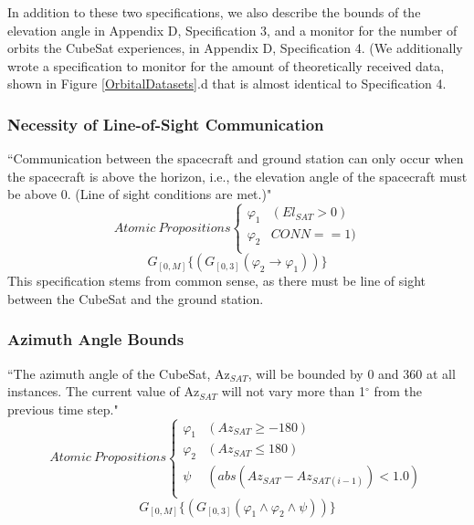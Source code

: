 \documentclass[conf]{new-aiaa}
\begin{document}
In addition to these two specifications, we also describe the bounds of the elevation angle in Appendix D, Specification 3, and a monitor for the number of orbits the CubeSat experiences, in Appendix D, Specification 4. (We additionally wrote a specification to monitor for the amount of theoretically received data, shown in Figure \ref{OrbitalDatasets}.d that is almost identical to Specification 4.

\subsubsection{\textbf{Necessity of Line-of-Sight Communication}}
“Communication between the spacecraft and ground station can only occur when the spacecraft is above the horizon, i.e., the elevation angle of the spacecraft must be above 0. (Line of sight conditions are met.)"
\[ Atomic\:Propositions \begin{cases}
  \varphi_1 & (El_{SAT} > 0) \\
  \varphi_2 & CONN == 1) \\
\end{cases} \]
\begin{equation}
    \label{Spec 1}
    G_{[0,M]} \{(G_{[0,3]}(\varphi_2 \rightarrow \varphi_1))\}
\end{equation} 
This specification stems from common sense, as there must be line of sight between the CubeSat and the ground station.

\subsubsection{\textbf{Azimuth Angle Bounds}}
“The azimuth angle of the CubeSat, Az$_{SAT}$, will be bounded by 0 and 360 at all instances. The current value of Az$_{SAT}$ will not vary more than 1$^{\circ}$ from the previous time step."
\[ Atomic\:Propositions \begin{cases}
  \varphi_1 & (Az_{SAT} \geq -180) \\
  \varphi_2 & (Az_{SAT} \leq 180) \\
  \psi & (abs(Az_{SAT} - Az_{SAT(i-1)}) < 1.0) \\
\end{cases} \]
\begin{equation}
    \label{Spec 2}
    G_{[0,M]} \{(G_{[0,3]}(\varphi_1 \wedge \varphi_2 \wedge \psi))\}
\end{equation} 
\end{document}

